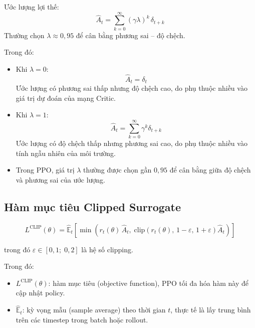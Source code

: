 \begin{itemize}
Ước lượng lợi thế:
\begin{equation}
    \hat{A}_t = \sum_{k=0}^{\infty} (\gamma\lambda)^k\, \delta_{t+k}
    \label{eq:gae}
\end{equation}
Thường chọn $\lambda \approx 0{,}95$ để cân bằng phương sai -- độ chệch.

Trong đó:
\begin{itemize}[leftmargin=1.5cm]
    \item Khi $\lambda = 0$: 
    \begin{equation}
        \hat{A}_t = \delta_t
    \end{equation}
    Ước lượng có phương sai thấp nhưng độ chệch cao, do phụ thuộc nhiều vào giá trị
    dự đoán của mạng Critic.

    \item Khi $\lambda = 1$:
    \begin{equation}
        \hat{A}_t = \sum_{k=0}^{\infty} \gamma^k \delta_{t+k}
    \end{equation}
    Ước lượng có độ chệch thấp nhưng phương sai cao, do phụ thuộc nhiều vào tính
    ngẫu nhiên của môi trường.

    \item Trong PPO, giá trị $\lambda$ thường được chọn gần $0{,}95$ để cân bằng giữa
    độ chệch và phương sai của ước lượng.
\end{itemize}

\subsection{Hàm mục tiêu Clipped Surrogate}

\begin{equation}
    L^{\text{CLIP}}(\theta) = \hat{\mathbb{E}}_t\!\left[
        \min\!\left(
            r_t(\theta)\,\hat{A}_t,\;
            \text{clip}\!\left(r_t(\theta),\,1{-}\varepsilon,\,1{+}\varepsilon\right)\hat{A}_t
        \right)
    \right]
    \label{eq:ppo_clip}
\end{equation}

trong đó $\varepsilon \in [0{,}1;\; 0{,}2]$ là hệ số clipping.

Trong đó:
\begin{itemize}[leftmargin=1.5cm]
    \item $L^{\text{CLIP}}(\theta)$: hàm mục tiêu (objective function), PPO tối đa hóa
    hàm này để cập nhật policy.

    \item $\hat{\mathbb{E}}_t$: kỳ vọng mẫu (sample average) theo thời gian $t$, thực tế
    là lấy trung bình trên các timestep trong batch hoặc rollout.


\end{itemize}
\end{itemize}

